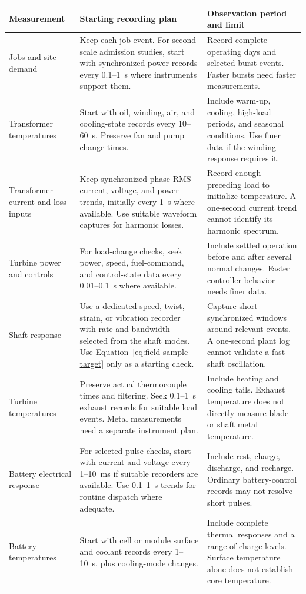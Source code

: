 \documentclass[11pt,a4paper]{report}
\begin{document}
\begin{longtable}{L{0.17\textwidth}L{0.36\textwidth}L{0.35\textwidth}}
\toprule Measurement & Starting recording plan & Observation period and limit \\ \midrule\endhead
Jobs and site demand & Keep each job event. For second-scale admission studies, start with synchronized power records every 0.1--1~s where instruments support them. & Record complete operating days and selected burst events. Faster bursts need faster measurements. \\
Transformer temperatures & Start with oil, winding, air, and cooling-state records every 10--60~s. Preserve fan and pump change times. & Include warm-up, cooling, high-load periods, and seasonal conditions. Use finer data if the winding response requires it. \\
Transformer current and loss inputs & Keep synchronized phase RMS current, voltage, and power trends, initially every 1~s where available. Use suitable waveform captures for harmonic losses. & Record enough preceding load to initialize temperature. A one-second current trend cannot identify its harmonic spectrum. \\
Turbine power and controls & For load-change checks, seek power, speed, fuel-command, and control-state data every 0.01--0.1~s where available. & Include settled operation before and after several normal changes. Faster controller behavior needs finer data. \\
Shaft response & Use a dedicated speed, twist, strain, or vibration recorder with rate and bandwidth selected from the shaft modes. Use Equation~\ref{eq:field-sample-target} only as a starting check. & Capture short synchronized windows around relevant events. A one-second plant log cannot validate a fast shaft oscillation. \\
Turbine temperatures & Preserve actual thermocouple times and filtering. Seek 0.1--1~s exhaust records for suitable load events. Metal measurements need a separate instrument plan. & Include heating and cooling tails. Exhaust temperature does not directly measure blade or shaft metal temperature. \\
Battery electrical response & For selected pulse checks, start with current and voltage every 1--10~ms if suitable recorders are available. Use 0.1--1~s trends for routine dispatch where adequate. & Include rest, charge, discharge, and recharge. Ordinary battery-control records may not resolve short pulses. \\
Battery temperatures & Start with cell or module surface and coolant records every 1--10~s, plus cooling-mode changes. & Include complete thermal responses and a range of charge levels. Surface temperature alone does not establish core temperature. \\

\end{longtable}
\end{document}
